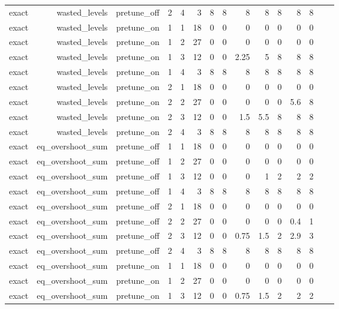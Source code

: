 \begin{table}[htbp]
\begin{tabular}{lrrrrrrrrrrrrrr}
exact & wasted\_levels & pretune\_off & 2 & 4 & 3 & 8 & 8 & 8 & 8 & 8 & 8 & 8 &  &  \\
exact & wasted\_levels & pretune\_on & 1 & 1 & 18 & 0 & 0 & 0 & 0 & 0 & 0 & 0 &  &  \\
exact & wasted\_levels & pretune\_on & 1 & 2 & 27 & 0 & 0 & 0 & 0 & 0 & 0 & 0 &  &  \\
exact & wasted\_levels & pretune\_on & 1 & 3 & 12 & 0 & 0 & 2.25 & 5 & 8 & 8 & 8 &  &  \\
exact & wasted\_levels & pretune\_on & 1 & 4 & 3 & 8 & 8 & 8 & 8 & 8 & 8 & 8 &  &  \\
exact & wasted\_levels & pretune\_on & 2 & 1 & 18 & 0 & 0 & 0 & 0 & 0 & 0 & 0 &  &  \\
exact & wasted\_levels & pretune\_on & 2 & 2 & 27 & 0 & 0 & 0 & 0 & 0 & 5.6 & 8 &  &  \\
exact & wasted\_levels & pretune\_on & 2 & 3 & 12 & 0 & 0 & 1.5 & 5.5 & 8 & 8 & 8 &  &  \\
exact & wasted\_levels & pretune\_on & 2 & 4 & 3 & 8 & 8 & 8 & 8 & 8 & 8 & 8 &  &  \\
exact & eq\_overshoot\_sum & pretune\_off & 1 & 1 & 18 & 0 & 0 & 0 & 0 & 0 & 0 & 0 &  &  \\
exact & eq\_overshoot\_sum & pretune\_off & 1 & 2 & 27 & 0 & 0 & 0 & 0 & 0 & 0 & 0 &  &  \\
exact & eq\_overshoot\_sum & pretune\_off & 1 & 3 & 12 & 0 & 0 & 0 & 1 & 2 & 2 & 2 &  &  \\
exact & eq\_overshoot\_sum & pretune\_off & 1 & 4 & 3 & 8 & 8 & 8 & 8 & 8 & 8 & 8 &  &  \\
exact & eq\_overshoot\_sum & pretune\_off & 2 & 1 & 18 & 0 & 0 & 0 & 0 & 0 & 0 & 0 &  &  \\
exact & eq\_overshoot\_sum & pretune\_off & 2 & 2 & 27 & 0 & 0 & 0 & 0 & 0 & 0.4 & 1 &  &  \\
exact & eq\_overshoot\_sum & pretune\_off & 2 & 3 & 12 & 0 & 0 & 0.75 & 1.5 & 2 & 2.9 & 3 &  &  \\
exact & eq\_overshoot\_sum & pretune\_off & 2 & 4 & 3 & 8 & 8 & 8 & 8 & 8 & 8 & 8 &  &  \\
exact & eq\_overshoot\_sum & pretune\_on & 1 & 1 & 18 & 0 & 0 & 0 & 0 & 0 & 0 & 0 &  &  \\
exact & eq\_overshoot\_sum & pretune\_on & 1 & 2 & 27 & 0 & 0 & 0 & 0 & 0 & 0 & 0 &  &  \\
exact & eq\_overshoot\_sum & pretune\_on & 1 & 3 & 12 & 0 & 0 & 0.75 & 1.5 & 2 & 2 & 2 &  &  \\

\end{tabular}
\end{table}
